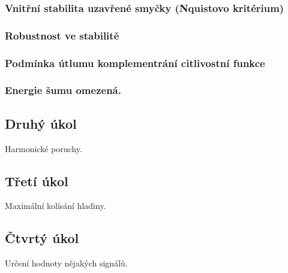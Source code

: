 \documentclass[12pt,a4paper]{article}
\begin{document}
\subsubsection{Vnitřní stabilita uzavřené smyčky (Nquistovo kritérium)}
\subsubsection{Robustnost ve stabilitě}
\subsubsection{Podmínka útlumu komplementrání citlivostní funkce}
\subsubsection{Energie šumu omezená.}
\subsection{Druhý úkol}
Harmonické poruchy.
\subsection{Třetí úkol}
Maximální kolísání hladiny.
\subsection{Čtvrtý úkol}
Určení hodnoty nějakých signálů.
\end{document}
